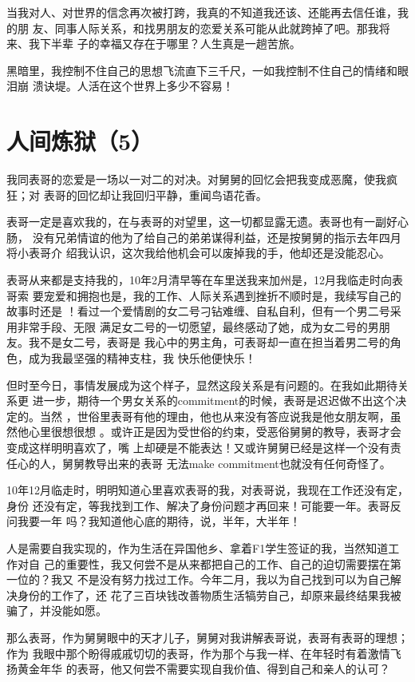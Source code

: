 \documentclass[12pt]{book}
\begin{document}
当我对人、对世界的信念再次被打跨，我真的不知道我还该、还能再去信任谁，我的朋
友、同事人际关系，和找男朋友的恋爱关系可能从此就跨掉了吧。那我将来、我下半辈
子的幸福又存在于哪里？人生真是一趟苦旅。

黑暗里，我控制不住自己的思想飞流直下三千尺，一如我控制不住自己的情绪和眼泪崩
溃诀堤。人活在这个世界上多少不容易！ 
\section{人间炼狱（5）}
\label{sec-10-5}

我同表哥的恋爱是一场以一对二的对决。对舅舅的回忆会把我变成恶魔，使我疯狂；对
表哥的回忆却让我回归平静，重闻鸟语花香。

表哥一定是喜欢我的，在与表哥的对望里，这一切都显露无遗。表哥也有一副好心肠，
没有兄弟情谊的他为了给自己的弟弟谋得利益，还是按舅舅的指示去年四月将小表哥介
绍我认识，这次我给他机会可以废掉我的手，他却还是没能忍心。

表哥从来都是支持我的，10年2月清早等在车里送我来加州是，12月我临走时向表哥索
要宠爱和拥抱也是，我的工作、人际关系遇到挫折不顺时是，我续写自己的故事时还是
！看过一个爱情剧的女二号刁钻难缠、自私自利，但有一个男二号采用非常手段、无限
满足女二号的一切愿望，最终感动了她，成为女二号的男朋友。我不是女二号，表哥是
我心中的男主角，可表哥却一直在担当着男二号的角色，成为我最坚强的精神支柱，我
快乐他便快乐！

但时至今日，事情发展成为这个样子，显然这段关系是有问题的。在我如此期待关系更
进一步，期待一个男女关系的commitment的时候，表哥是迟迟做不出这个决定的。当然
，世俗里表哥有他的理由，他也从来没有答应说我是他女朋友啊，虽然他心里很想很想
。或许正是因为受世俗的约束，受恶俗舅舅的教导，表哥才会变成这样明明喜欢了，嘴
上却硬是不能表达！又或许舅舅已经是这样一个没有责任心的人，舅舅教导出来的表哥
无法make commitment也就没有任何奇怪了。

10年12月临走时，明明知道心里喜欢表哥的我，对表哥说，我现在工作还没有定，身份
还没有定，等我找到工作、解决了身份问题才再回来！可能要一年。表哥反问我要一年
吗？我知道他心底的期待，说，半年，大半年！

人是需要自我实现的，作为生活在异国他乡、拿着F1学生签证的我，当然知道工作对自
己的重要性，我又何尝不是从来都把自己的工作、自己的迫切需要摆在第一位的？我又
不是没有努力找过工作。今年二月，我以为自己找到可以为自己解决身份的工作了，还
花了三百块钱改善物质生活犒劳自己，却原来最终结果我被骗了，并没能如愿。

那么表哥，作为舅舅眼中的天才儿子，舅舅对我讲解表哥说，表哥有表哥的理想；作为
我眼中那个盼得戚戚切切的表哥，作为那个与我一样、在年轻时有着激情飞扬黄金年华
的表哥，他又何尝不需要实现自我价值、得到自己和亲人的认可？
\end{document}
